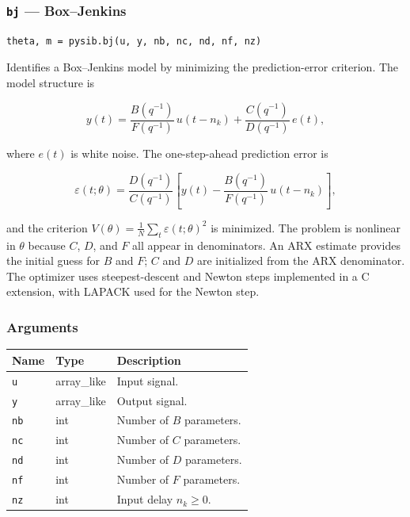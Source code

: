 \documentclass[../main]{subfiles}
\begin{document}
\newpage

\subsubsection{\texttt{bj} --- Box--Jenkins}

\begin{lstlisting}
theta, m = pysib.bj(u, y, nb, nc, nd, nf, nz)
\end{lstlisting}

Identifies a Box--Jenkins model by minimizing the prediction-error
criterion.  The model structure is

\[
  y(t) = \frac{B(q^{-1})}{F(q^{-1})}\,u(t - n_k)
       + \frac{C(q^{-1})}{D(q^{-1})}\,e(t),
\]

where $e(t)$ is white noise.
The one-step-ahead prediction error is

\[
  \varepsilon(t;\theta) =
  \frac{D(q^{-1})}{C(q^{-1})}
  \left[y(t) - \frac{B(q^{-1})}{F(q^{-1})}\,u(t-n_k)\right],
\]

and the criterion $V(\theta) = \tfrac{1}{N}\sum_t \varepsilon(t;\theta)^2$
is minimized.  The problem is nonlinear in $\theta$ because $C$, $D$,
and $F$ all appear in denominators.
An ARX estimate provides the initial guess for $B$ and $F$; $C$ and
$D$ are initialized from the ARX denominator.  The optimizer uses
steepest-descent and Newton steps implemented in a C extension, with
LAPACK used for the Newton step.

\subsubsection*{Arguments}
\begin{center}
\begin{tabular}{lll}
  \toprule
  Name & Type & Description \\
  \midrule
  \texttt{u}  & array\_like & Input signal. \\
  \texttt{y}  & array\_like & Output signal. \\
  \texttt{nb} & int & Number of $B$ parameters. \\
  \texttt{nc} & int & Number of $C$ parameters. \\
  \texttt{nd} & int & Number of $D$ parameters. \\
  \texttt{nf} & int & Number of $F$ parameters. \\
  \texttt{nz} & int & Input delay $n_k \geq 0$. \\
  \bottomrule
\end{tabular}
\end{center}
\end{document}
